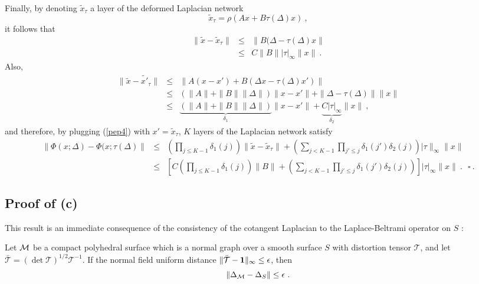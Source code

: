 Finally, by denoting $\tilde{x}_\tau$ a layer of the deformed Laplacian network 
$$\tilde{x}_\tau = \rho( A x + B \tau(\Delta) x)~,$$
it follows that 
\begin{eqnarray}
\label{pep4}
\| \tilde{x} - \tilde{x}_\tau \| &\leq& \| B ( \Delta - \tau(\Delta) x \| \\
&\leq & C \| B \| | \tau|_\infty \|x \| ~.
\end{eqnarray}
Also, 
\begin{eqnarray*}
\| \tilde{x} - \tilde{x'}_\tau \| &\leq& \| A( x - x') + B ( \Delta x - \tau(\Delta) x') \| \\
&\leq & (\| A \| + \| B \| \| \Delta \|  )\| x - x'\|  + \| \Delta - \tau(\Delta) \| \| x\| \\
& \leq & \underbrace{(\| A \| + \| B \| \| \Delta \|  )}_{\delta_1}\| x - x'\|  + \underbrace{C | \tau |_\infty}_{\delta_2} \| x \|~, 
\end{eqnarray*}
and therefore, by plugging (\ref{pep4}) with $x' = \tilde{x}_\tau$, 
$K$ layers of the Laplacian network satisfy 
\begin{eqnarray*}
\| \Phi(x; \Delta) - \Phi(x; \tau(\Delta) \| &\leq& \left(\prod_{j \leq K-1} \delta_1(j)\right) \| \tilde{x} - \tilde{x}_\tau\| + \left(\sum_{j < K-1} \prod_{j' \leq j} \delta_1(j') \delta_2(j) \right)  | \tau \|_\infty \|x \| \\
&\leq & \left[C  \left(\prod_{j \leq K-1} \delta_1(j)\right)  \|B \| +  \left(\sum_{j < K-1} \prod_{j' \leq j} \delta_1(j') \delta_2(j) \right)  \right] | \tau |_\infty \|x \| ~. ~~~ \square~.
\end{eqnarray*}



\subsection{Proof of (c)}

This result is an immediate consequence of the consistency of the cotangent Laplacian to the Laplace-Beltrami operator on $S$ \cite{laplacian_convergence}:
\begin{theorem} Let ${\mathcal{M}}$ be a compact polyhedral surface which is a normal graph over a smooth surface $S$ 
with distortion tensor $\mathcal{T}$, and let $\bar{\mathcal{T}} = (\det \mathcal{T})^{1/2} \mathcal{T}^{-1}$. 
If the normal field uniform distance $\| \bar{\mathcal{T}} - {\bf 1} \|_\infty \leq \epsilon$, then
\begin{equation}
\label{blabla1}
\| \Delta_{\mathcal{M}} - \Delta_S\| \leq \epsilon~.
\end{equation}
\end{theorem}


